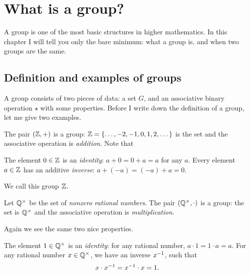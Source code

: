 \chapter{What is a group?}
A group is one of the most basic structures in higher mathematics.
In this chapter I will tell you only the bare minimum:
what a group is, and when two groups are the same.

\section{Definition and examples of groups}

A group consists of two pieces of data: a set $G$,
and an associative binary operation $\star$ with some properties.
Before I write down the definition of a group, let me give two examples.

\begin{example}
	The pair $(\mathbb Z, +)$ is a group:
	$\mathbb Z = \left\{ \dots,-2,-1,0,1,2,\dots \right\}$ is the set
	and the associative operation is \emph{addition}.
	Note that
	\begin{itemize}
		\ii The element $0 \in \mathbb Z$ is an \emph{identity}:
		$a+0=0+a = a$ for any $a$.
		\ii Every element $a \in \mathbb Z$ has an additive \emph{inverse}: $a + (-a) = (-a) + a = 0$.
	\end{itemize}
	We call this group $\mathbb Z$.
\end{example}
\begin{example}
	Let $\mathbb Q^\times$ be the set of \emph{nonzero rational numbers}.
	The pair $(\mathbb Q^\times, \cdot)$ is a group:
	the set is $\mathbb Q^\times$
	and the associative operation is \emph{multiplication}.

	Again we see the same two nice properties.
	\begin{itemize}
		\ii The element $1 \in \mathbb Q^\times$ is an \emph{identity}:
		for any rational number, $a \cdot 1 = 1 \cdot a = a$.
		\ii For any rational number $x \in \mathbb Q^\times$,
		we have an inverse $x^{-1}$, such that
		\[ x \cdot x^{-1} = x^{-1} \cdot x = 1. \]
	\end{itemize}
\end{example}

